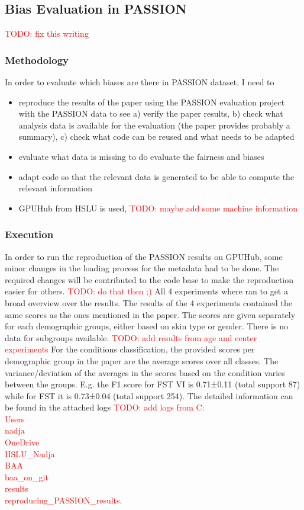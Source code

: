 \documentclass[12pt, a4paper, oneside]{book}   	%
\renewcommand{\todo}[1]{\textcolor{red}{TODO: #1}}
\renewcommand{\paragraph}[1]{%
	\subsubsection*{#1}%
}
\begin{document}
		
		\subsection{Bias Evaluation in PASSION}
		\todo{fix this writing}
		\paragraph{Methodology}
		In order to evaluate which biases are there in PASSION dataset, I need to
		\begin{itemize}
			\item reproduce the results of the paper using the PASSION evaluation project with the PASSION data to see a) verify the paper results, b) check what analysis data is available for the evaluation (the paper provides probably a summary), c) check what code can be reused and what needs to be adapted
			\item evaluate what data is missing to do evaluate the fairness and biases
			\item adapt code so that the relevant data is generated to be able to compute the relevant information
			\item GPUHub from HSLU is used, \todo{maybe add some machine information}
		\end{itemize}
		\paragraph{Execution}
			In order to run the reproduction of the PASSION results on GPUHub, some minor changes in the loading process for the metadata had to be done. The required changes will be contributed to the code base to make the reproduction easier for others. \todo{do that then ;)}
			All 4 experiments where ran to get a broad overview over the results. The results of the 4 experiments contained the same scores as the ones mentioned in the paper. The scores are given separately for each demographic groups, either based on skin type or gender. There is no data for subgroups available. \todo{add results from age and center experiments}
			For the conditions classification, the provided scores per demographic group in the paper are the average scores over all classes. The variance/deviation of the averages in the scores based on the condition varies between the groups. E.g. the F1 score for \gls{FST} VI is 0.71±0.11 (total support 87) while for \gls{FST} it is 0.73±0.04 (total support 254). 
			The detailed information can be found in the attached logs \todo{add logs from C:\\Users\\nadja\\OneDrive\\HSLU\_Nadja\\BAA\\baa\_on\_git\\results\\reproducing\_PASSION\_results}.
			
\end{document}
